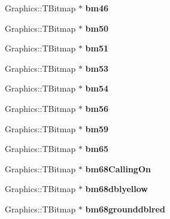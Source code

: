 \begin{DoxyCompactItemize}
Graphics\+::\+T\+Bitmap $\ast$ {\bfseries bm46}
\item 
\mbox{\label{class_t_rail_graphics_a08d37c8f65315e707586d7b47d2aca89}} 
Graphics\+::\+T\+Bitmap $\ast$ {\bfseries bm50}
\item 
\mbox{\label{class_t_rail_graphics_a5d25a91696ea7f39fef4737d6b871af2}} 
Graphics\+::\+T\+Bitmap $\ast$ {\bfseries bm51}
\item 
\mbox{\label{class_t_rail_graphics_a7e6c8cd2c6da14aa7313715e728cc720}} 
Graphics\+::\+T\+Bitmap $\ast$ {\bfseries bm53}
\item 
\mbox{\label{class_t_rail_graphics_aee276a3190506a2c17a69134373db2dd}} 
Graphics\+::\+T\+Bitmap $\ast$ {\bfseries bm54}
\item 
\mbox{\label{class_t_rail_graphics_ada3e19ef17e7d225925148ca00616dde}} 
Graphics\+::\+T\+Bitmap $\ast$ {\bfseries bm56}
\item 
\mbox{\label{class_t_rail_graphics_a5f5e353a1ec74c775d88dc615e9f5974}} 
Graphics\+::\+T\+Bitmap $\ast$ {\bfseries bm59}
\item 
\mbox{\label{class_t_rail_graphics_a775a69773a16aeab4120ad80891d9a28}} 
Graphics\+::\+T\+Bitmap $\ast$ {\bfseries bm65}
\item 
\mbox{\label{class_t_rail_graphics_aa646259af607d57e6c6491811370faab}} 
Graphics\+::\+T\+Bitmap $\ast$ {\bfseries bm68\+Calling\+On}
\item 
\mbox{\label{class_t_rail_graphics_a167c325e9c72d2bda4f6fbd1684c1a46}} 
Graphics\+::\+T\+Bitmap $\ast$ {\bfseries bm68dblyellow}
\item 
\mbox{\label{class_t_rail_graphics_af074cf293aa75b2365735198daa5297a}} 
Graphics\+::\+T\+Bitmap $\ast$ {\bfseries bm68grounddblred}
\item 
\mbox{\label{class_t_rail_graphics_a54d315961d84625cfde5ef96b2709865}} 

\end{DoxyCompactItemize}

